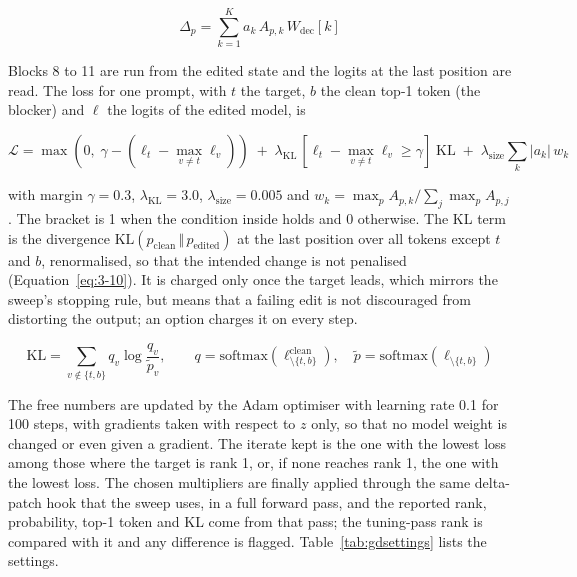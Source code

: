 \documentclass[12pt,a4paper]{report}
\begin{document}
\begin{equation}
\Delta_p = \sum_{k=1}^{K} a_k\, A_{p,k}\, W_{\text{dec}}[k]
\label{eq:3-8}
\end{equation}

Blocks 8 to 11 are run from the edited state and the logits at the last position are read. The loss for one prompt, with $t$ the target, $b$ the clean top-1 token (the blocker) and $\ell$ the logits of the edited model, is

\begin{equation}
\mathcal{L} = \max\!\left(0,\; \gamma - (\ell_t - \max_{v \ne t} \ell_v)\right) \;+\; \lambda_{\text{KL}}\, \left[\ell_t - \max_{v \ne t}\ell_v \ge \gamma\right]\; \mathrm{KL} \;+\; \lambda_{\text{size}} \sum_k |a_k|\, w_k
\label{eq:3-9}
\end{equation}

with margin $\gamma = 0.3$, $\lambda_{\text{KL}} = 3.0$, $\lambda_{\text{size}} = 0.005$ and $w_k = \max_p A_{p,k} / \sum_j \max_p A_{p,j}$. The bracket is 1 when the condition inside holds and 0 otherwise. The KL term is the divergence $\mathrm{KL}(p_{\text{clean}} \,\Vert\, p_{\text{edited}})$ at the last position over all tokens except $t$ and $b$, renormalised, so that the intended change is not penalised (Equation~\ref{eq:3-10}). It is charged only once the target leads, which mirrors the sweep's stopping rule, but means that a failing edit is not discouraged from distorting the output; an option charges it on every step.

\begin{equation}
\mathrm{KL} = \sum_{v \notin \{t,b\}} q_v \log\frac{q_v}{\tilde{p}_v}, \qquad q = \mathrm{softmax}(\ell^{\text{clean}}_{\setminus\{t,b\}}), \quad \tilde{p} = \mathrm{softmax}(\ell_{\setminus\{t,b\}})
\label{eq:3-10}
\end{equation}

The free numbers are updated by the Adam optimiser \cite{r36} with learning rate 0.1 for 100 steps, with gradients taken with respect to $z$ only, so that no model weight is changed or even given a gradient. The iterate kept is the one with the lowest loss among those where the target is rank 1, or, if none reaches rank 1, the one with the lowest loss. The chosen multipliers are finally applied through the same delta-patch hook that the sweep uses, in a full forward pass, and the reported rank, probability, top-1 token and KL come from that pass; the tuning-pass rank is compared with it and any difference is flagged. Table~\ref{tab:gdsettings} lists the settings.
\end{document}
